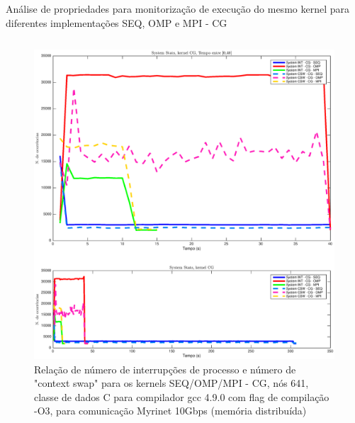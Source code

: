 \documentclass{beamer}
\begin{document}
\begin{frame}{ \tiny Análise de propriedades para monitorização de execução do mesmo kernel para diferentes implementações SEQ, OMP e MPI - CG}
\begin{columns}[t]
\centering
\begin{figure}[H]
\centering
\includegraphics[width=0.9\columnwidth]{EPS/dstat_CG_seq_vs_omp_vs_mpi/system.eps}
\caption{\tiny Relação de número de interrupções de processo e número de "context swap" para os kernels SEQ/OMP/MPI - CG, nós 641, classe de dados C para compilador gcc 4.9.0 com flag de compilação  -O3, para comunicação Myrinet 10Gbps (memória distribuída)}
\label{dstat_cg_SOM_system}
\end{figure}
\end{columns}

\end{frame}


\begin{frame}
  \titlepage
\end{frame}

  
\end{document}
